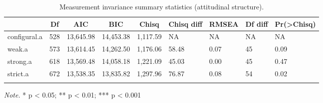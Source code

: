 \documentclass[
  man]{apa6}
\begin{document}
\begin{table}[tbp]

\begin{center}
\begin{threeparttable}

\caption{\label{tab:measinv.pilot.att}Measurement invariance summary statistics (attitudinal structure).}

\begin{tabular}{lllllllll}
\toprule
 & \multicolumn{1}{c}{Df} & \multicolumn{1}{c}{AIC} & \multicolumn{1}{c}{BIC} & \multicolumn{1}{c}{Chisq} & \multicolumn{1}{c}{Chisq diff} & \multicolumn{1}{c}{RMSEA} & \multicolumn{1}{c}{Df diff} & \multicolumn{1}{c}{Pr(>Chisq)}\\
\midrule
configural.a & 528 & 13,645.98 & 14,453.38 & 1,117.59 & NA & NA & NA & NA\\
weak.a & 573 & 13,614.45 & 14,262.50 & 1,176.06 & 58.48 & 0.07 & 45 & 0.09\\
strong.a & 618 & 13,569.48 & 14,058.18 & 1,221.09 & 45.03 & 0.00 & 45 & 0.47\\
strict.a & 672 & 13,538.35 & 13,835.82 & 1,297.96 & 76.87 & 0.08 & 54 & 0.02\\
\bottomrule
\addlinespace
\end{tabular}

\begin{tablenotes}[para]
\normalsize{\textit{Note.} * p < 0.05; ** p < 0.01; *** p < 0.001}
\end{tablenotes}

\end{threeparttable}
\end{center}

\end{table}
\end{document}
